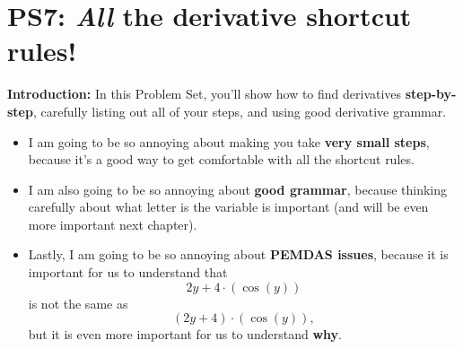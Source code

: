 

\newcommand{\diff}[1]{\frac{d}{d#1}}
\renewcommand{\blue}[1]{\textcolor{blue}{\boxed{#1}}}


\section{PS7: \textit{All} the derivative shortcut rules!}

\textbf{Introduction:} 
In this Problem Set, you'll show how to find derivatives \textbf{step-by-step}, carefully listing out all of your steps, and using good derivative grammar. 
\begin{itemize}
    \item I am going to be so annoying about making you take \textbf{very small steps}, because it's a good way to get comfortable with all the shortcut rules.
    \item I am also going to be so annoying about \textbf{good grammar}, because thinking carefully about what letter is the variable is important (and will be even more important next chapter).
    \item Lastly, I am going to be so annoying about \textbf{PEMDAS issues}, because it is important for us to understand that \[2y + 4 \cdot (\cos(y))\] is not the same as \[(2y + 4)\cdot(\cos(y)),\] but it is even more important for us to understand \textbf{why}.
\end{itemize}

\hrulefill


